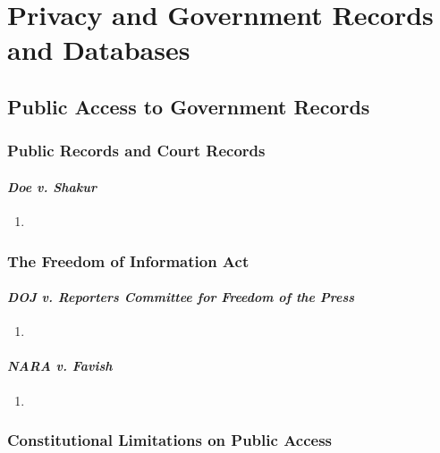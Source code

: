 \section{Privacy and Government Records and Databases}

\subsection{Public Access to Government Records}

\subsubsection{Public Records and Court Records}


\paragraph{\emph{Doe v. Shakur}} %

\begin{enumerate}
    \item 
\end{enumerate}

\subsubsection{The Freedom of Information Act}


\paragraph{\emph{DOJ v. Reporters Committee for Freedom of the Press}} %

\begin{enumerate}
    \item 
\end{enumerate}

\paragraph{\emph{NARA v. Favish}} %

\begin{enumerate}
    \item 
\end{enumerate}

\subsubsection{Constitutional Limitations on Public Access}

